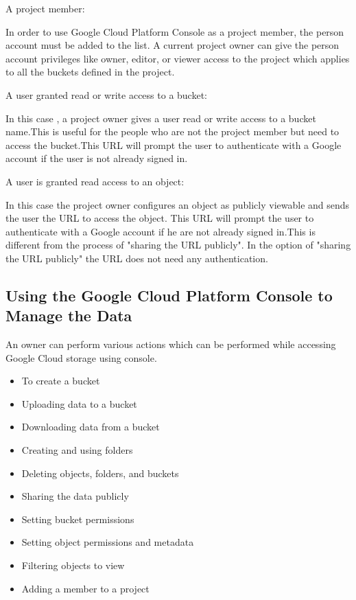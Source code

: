 \documentclass[9pt,twocolumn,twoside]{../../styles/osajnl}
\begin{document}
\begin{flushleft} 
A project member: 

In order to use Google Cloud Platform Console as a project member, the person account must be added to the list. A current project owner can give the person account privileges like owner, editor, or viewer access to the project which applies to all the buckets defined in the project.
\end{flushleft}


\begin{flushleft}
 A user granted read or write access to a bucket:

In this case , a project owner  gives a user read or write access to a bucket name.This is useful for the people who are not the project member but need to access the bucket.This URL will prompt the user to authenticate with a Google account if the user is not already signed in.
	
\end{flushleft}


\begin{flushleft}
A user is granted read access to an object:

In this case the project owner configures an object as publicly viewable and sends the user the URL to access the object. This URL will prompt the user to authenticate with a Google account if he are not already signed in.This is different from the process of "sharing the URL publicly". In the option of "sharing the URL publicly" the URL does not need any authentication.

\end{flushleft}




\subsection{Using the Google Cloud Platform Console to Manage the Data}

An owner can perform various actions which can be performed while accessing Google Cloud storage using console.

\begin{itemize}


\item To create a bucket
\item Uploading data to a bucket
\item Downloading data from a bucket
\item Creating and using folders
\item Deleting objects, folders, and buckets
\item Sharing the data publicly
\item Setting bucket permissions
\item Setting object permissions and metadata
\item Filtering objects to view
\item Adding a member to a project

\end{itemize} 
\end{document}

